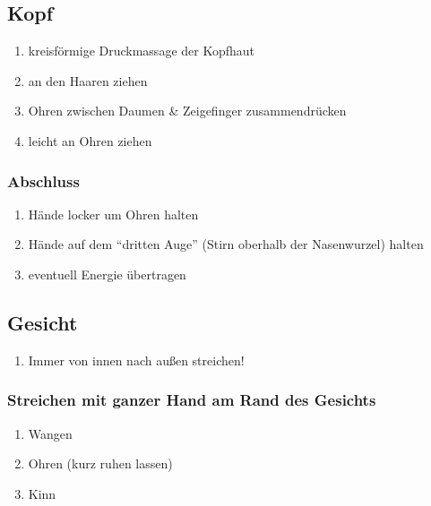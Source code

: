 \subsection{Kopf}

\begin{enumerate}
\item kreisförmige Druckmassage der Kopfhaut
\item an den Haaren ziehen
\item Ohren zwischen Daumen \& Zeigefinger zusammendrücken
\item leicht an Ohren ziehen
\end{enumerate}

\subsubsection{Abschluss}
\begin{enumerate}
\item Hände locker um Ohren halten
\item Hände auf dem "`dritten Auge"' (Stirn oberhalb der Nasenwurzel) halten
\item eventuell Energie übertragen
\end{enumerate}


\subsection{Gesicht}
\begin{enumerate}
\item Immer von innen nach außen streichen!
\end{enumerate}

\subsubsection{Streichen mit ganzer Hand am Rand des Gesichts}
\begin{enumerate}
\item Wangen
\item Ohren (kurz ruhen lassen)
\item Kinn
\end{enumerate}

